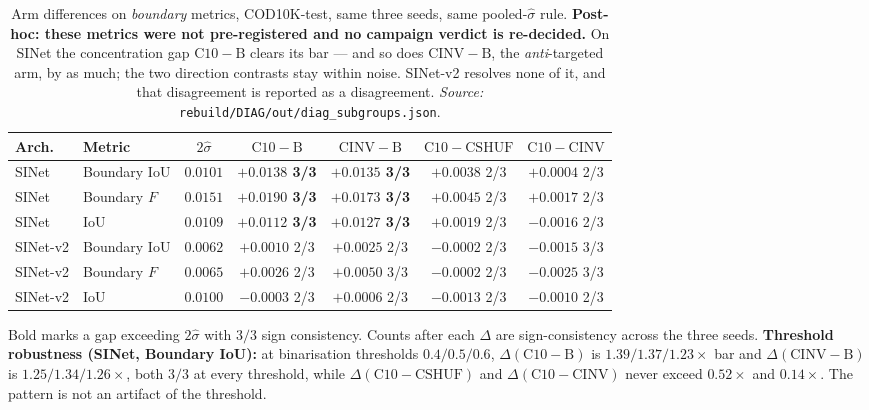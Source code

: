 \begin{table}[t]
\caption{Arm differences on \emph{boundary} metrics, COD10K-test, same three seeds, same pooled-$\hat{\sigma}$ rule. \textbf{Post-hoc: these metrics were not pre-registered and no campaign verdict is re-decided.} On SINet the concentration gap $\mathrm{C10}-\mathrm{B}$ clears its bar --- and so does $\mathrm{CINV}-\mathrm{B}$, the \emph{anti}-targeted arm, by as much; the two direction contrasts stay within noise. SINet-v2 resolves none of it, and that disagreement is reported as a disagreement. \emph{Source:} \texttt{rebuild/DIAG/out/diag\_subgroups.json}.}
\label{tab:boundary}
\begin{center}
\footnotesize
\setlength{\tabcolsep}{3.5pt}
\begin{tabular}{@{}llccccc@{}}
\toprule
Arch. & Metric & $2\hat{\sigma}$ & $\mathrm{C10}\!-\!\mathrm{B}$ & $\mathrm{CINV}\!-\!\mathrm{B}$ & $\mathrm{C10}\!-\!\mathrm{CSHUF}$ & $\mathrm{C10}\!-\!\mathrm{CINV}$ \\
\midrule
SINet & Boundary IoU & $0.0101$ & \textbf{$+0.0138$ 3/3} & \textbf{$+0.0135$ 3/3} & $+0.0038$ 2/3 & $+0.0004$ 2/3 \\
SINet & Boundary $F$ & $0.0151$ & \textbf{$+0.0190$ 3/3} & \textbf{$+0.0173$ 3/3} & $+0.0045$ 2/3 & $+0.0017$ 2/3 \\
SINet & IoU & $0.0109$ & \textbf{$+0.0112$ 3/3} & \textbf{$+0.0127$ 3/3} & $+0.0019$ 2/3 & $-0.0016$ 2/3 \\
\midrule
SINet-v2 & Boundary IoU & $0.0062$ & $+0.0010$ 2/3 & $+0.0025$ 2/3 & $-0.0002$ 2/3 & $-0.0015$ 3/3 \\
SINet-v2 & Boundary $F$ & $0.0065$ & $+0.0026$ 2/3 & $+0.0050$ 3/3 & $-0.0002$ 2/3 & $-0.0025$ 3/3 \\
SINet-v2 & IoU & $0.0100$ & $-0.0003$ 2/3 & $+0.0006$ 2/3 & $-0.0013$ 2/3 & $-0.0010$ 2/3 \\
\bottomrule
\end{tabular}
\end{center}
\footnotesize Bold marks a gap exceeding $2\hat{\sigma}$ with $3/3$ sign consistency. Counts after each $\Delta$ are sign-consistency across the three seeds. \textbf{Threshold robustness (SINet, Boundary IoU):} at binarisation thresholds $0.4/0.5/0.6$, $\Delta(\mathrm{C10}-\mathrm{B})$ is $1.39/1.37/1.23\times$ bar and $\Delta(\mathrm{CINV}-\mathrm{B})$ is $1.25/1.34/1.26\times$, both $3/3$ at every threshold, while $\Delta(\mathrm{C10}-\mathrm{CSHUF})$ and $\Delta(\mathrm{C10}-\mathrm{CINV})$ never exceed $0.52\times$ and $0.14\times$. The pattern is not an artifact of the threshold.
\end{table}
